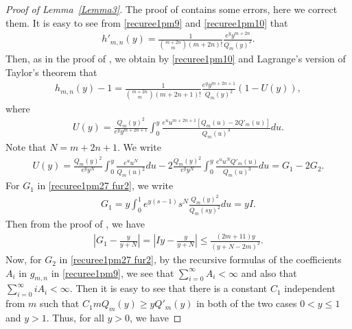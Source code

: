 \documentclass[12pt]{amsart}
\numberwithin{equation}{section}
\begin{document}
\begin{proof}[Proof of Lemma~\ref{Lemma3}]
The proof of \cite[Lemma~2.3]{Zhang2024} contains some errors, here we correct them.  It is easy to see from \eqref{recuree1pm9} and \eqref{recuree1pm10} that
\begin{equation*}
\begin{split}
h'_{m,n}(y)=\frac{1}{\binom{m+2n}{m}(m+2n)!}\frac{e^yy^{m+2n}}{Q_m(y)^2}.
\end{split}
\end{equation*}
Then, as in the proof of \cite[Lemma~2.3]{Zhang2024}, we obtain by \eqref{recuree1pm10} and Lagrange's version of Taylor's theorem that
\begin{equation}\label{recuree1pm27}
\begin{split}
h_{m,n}(y)-1=\frac{1}{\binom{m+2n}{m}(m+2n+1)!}\frac{e^yy^{m+2n+1}}{Q_m(y)^2}\left(1-U(y)\right),
\end{split}
\end{equation}
where
\begin{equation}\label{recuree1pm27 fur1}
\begin{split}
U(y)=\frac{Q_m(y)^2}{e^yy^{m+2n+1}}\int_0^{y}\frac{e^{u}u^{m+2n+1}[Q_m(u)-2Q'_m(u)]}{Q_m(u)^3}du.
\end{split}
\end{equation}
Note that $N=m+2n+1$. We write
\begin{equation}\label{recuree1pm27 fur2}
\begin{split}
U(y)=\frac{Q_m(y)^2}{e^yy^{N}}\int_0^{y}\frac{e^{u}u^{N}}{Q_m(u)^2}du-2\frac{Q_m(y)^2}{e^yy^{N}}\int_0^{y}\frac{e^{u}u^{N}Q'_m(u)}{Q_m(u)^3}du=G_1-2G_2.
\end{split}
\end{equation}
For $G_1$ in \eqref{recuree1pm27 fur2}, we write
\begin{equation}\label{recuree1pm27 fur2 rqr1}
\begin{split}
G_1=y\int_0^{1}e^{y(s-1)}s^{N}\frac{Q_m(y)^2}{Q_m(sy)^2}du=yI.
\end{split}
\end{equation}
Then from the proof of \cite[Lemma~2.3]{Zhang2024}, we have
\begin{equation}\label{recurfai   5 fur4}
\begin{split}
\left|G_1-\frac{y}{y+N}\right|=\left|Iy-\frac{y}{y+N}\right|\leq \frac{(2m+11)y}{(y+N-2m)^2}.
\end{split}
\end{equation}
Now, for $G_2$ in \eqref{recuree1pm27 fur2}, by the recursive formulas of the coefficients $A_i$ in $g_{m,n}$ in \eqref{recuree1pm9}, we see that $\sum_{i=0}^{\infty}A_i<\infty$ and also that $\sum_{i=0}^{\infty}iA_i<\infty$. Then it is easy to see that there is a constant $C_1$ independent from $m$ such that $C_1mQ_m(y)\geq yQ'_m(y)$ in both of the two cases $0<y \leq 1$ and $y>1$. Thus, for all $y>0$, we have

\end{proof}
\end{document}
